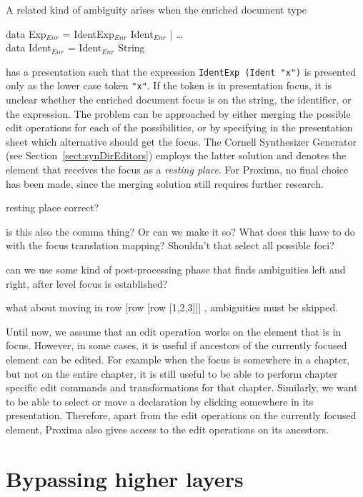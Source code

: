 A related kind of ambiguity arises when the enriched document type

\small \ttfamily
\begin{tabbing}
data Exp$_{Enr}$ = IdentExp$_{Enr}$ Ident$_{Enr}$ | \dots \\
data Ident$_{Enr}$ = Ident$_{Enr}$ String
\end{tabbing}
\rmfamily \normalsize

has a presentation such that the expression \verb|IdentExp (Ident "x")| is presented only as the lower case token \verb|"x"|. If the token is in presentation focus, it is unclear whether the enriched document focus is on the string, the identifier, or the expression. The problem can be approached by either merging the possible edit operations for each of the possibilities, or by specifying in the presentation sheet which alternative should get the focus. The Cornell Synthesizer Generator (see Section~\ref{sect:synDirEditors}) employs the latter solution and denotes the element that receives the focus as a {\em resting place}. For Proxima, no final choice has been made, since the merging solution still requires further research.

\bc
resting place correct?

is this also the comma thing? Or can we make it so?
What does this have to do with the focus translation mapping? Shouldn't that select all possible foci?

can we use some kind of post-processing phase that finds ambiguities left and right, after level focus is established?

what about moving in row [row [row [1,2,3]]] , ambiguities must be skipped. 
\ec

Until now, we assume that an edit operation works on the element that is in focus. However, in some cases, it is useful if ancestors of the currently focused element can be edited. For example when the focus is somewhere in a chapter, but not on the entire chapter, it is still useful to be able to perform chapter specific edit commands and transformations for that chapter. Similarly, we want to be able to select or move a declaration by clicking somewhere in its presentation. Therefore, apart from the edit operations on the currently focused element, Proxima also gives access to the edit operations on its ancestors. 


%																
%																
%																
\section{Bypassing higher layers} \label{sect:bypassingLayers}

